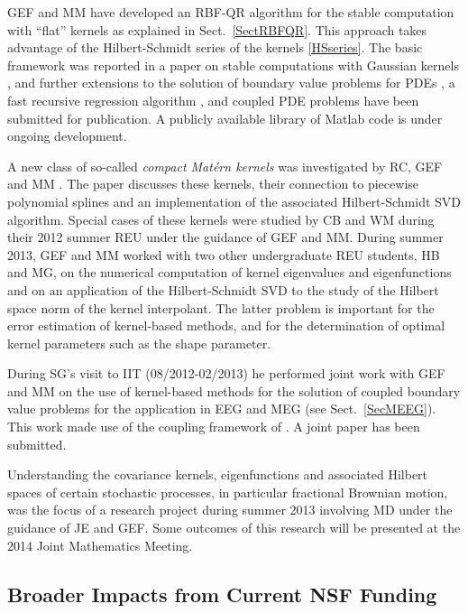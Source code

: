 \documentclass[11pt]{NSFamsart}
\newcommand{\Matlab}{{\sc Matlab}\xspace}
\begin{document}
GEF and MM have developed an RBF-QR algorithm for the stable computation with ``flat'' kernels as explained in Sect.~\ref{SectRBFQR}. This approach takes advantage of the Hilbert-Schmidt series of the kernels \eqref{HSseries}. The basic framework was reported in a paper on stable computations with Gaussian kernels \citep{FMcC12}, and further extensions to the solution of boundary value problems for PDEs \citep{McCourt13}, a fast recursive regression algorithm \citep{McCourt13b}, and coupled PDE problems \citep{McCF13} have been submitted for publication. A publicly available library of \Matlab code \citep{McCFBG13} is under ongoing development.

A new class of so-called \emph{compact Mat\'ern kernels} was investigated by RC, GEF and MM \citep{CavorettoEtAl14}. The paper discusses these kernels, their connection to piecewise polynomial splines and an implementation of the associated Hilbert-Schmidt SVD algorithm. Special cases of these kernels were studied by CB and WM during their 2012 summer REU under the guidance of GEF and MM. During summer 2013, GEF and MM worked with two other undergraduate REU students, HB and MG, on the numerical computation of kernel eigenvalues and eigenfunctions and on an application of the Hilbert-Schmidt SVD to the study of the Hilbert space norm of the kernel interpolant. The latter problem is important for the error estimation of kernel-based methods, and for the determination of optimal kernel parameters such as the shape parameter.

During SG's visit to IIT (08/2012-02/2013) he performed joint work with GEF and MM on the use of kernel-based methods for the solution of coupled boundary value problems for the application in EEG and MEG (see Sect.~\ref{SecMEEG}). This work made use of the coupling framework of \cite{McCF13}. A joint paper \citep{AFFGM13} has been submitted.

Understanding the covariance kernels, eigenfunctions and associated Hilbert spaces of certain stochastic processes, in particular fractional Brownian motion, was the focus of a research project during summer 2013 involving MD under the guidance of JE and GEF. Some outcomes of this research will be presented at the 2014 Joint Mathematics Meeting.

\subsection{Broader Impacts from Current NSF Funding}
\end{document}
